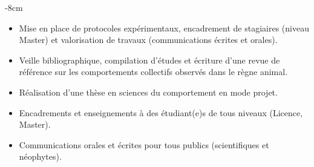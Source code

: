 \documentclass[10pt,a4paper]{altacv}
\begin{document}

\begin{adjustwidth}{}{-8cm}
\makecvheader
\end{adjustwidth}


\begin{itemize}
\item Mise en place de protocoles expérimentaux, encadrement de stagiaires (niveau Master) et valorisation de travaux (communications écrites et orales).
\item Veille bibliographique, compilation d'études et écriture d'une revue de référence sur les comportements collectifs observés dans le règne animal.

\end{itemize}

\divider

\begin{itemize}
\item Réalisation d'une thèse en sciences du comportement en mode projet.
\item Encadrements et enseignements à des étudiant(e)s de tous niveaux (Licence, Master).
\item Communications orales et écrites pour tous publics (scientifiques et néophytes).
\end{itemize}
\end{document}
